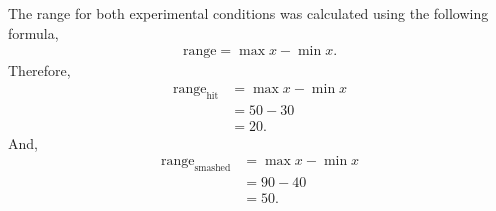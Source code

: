\documentclass[a4paper,twocolumn]{report}
\begin{document}
The range for both experimental conditions was calculated using the following
formula,
\begin{align*}
    \text{range} = \max{x} - \min{x}.
\end{align*}
Therefore,
\begin{align*}
    \text{range}_{\text{hit}} &= \max{x} - \min{x}\\
    &= 50 - 30\\
    &= 20.
\end{align*}
And,
\begin{align*}
    \text{range}_{\text{smashed}} &= \max{x} - \min{x}\\
    &= 90 - 40\\
    &= 50.
\end{align*}
\end{document}

